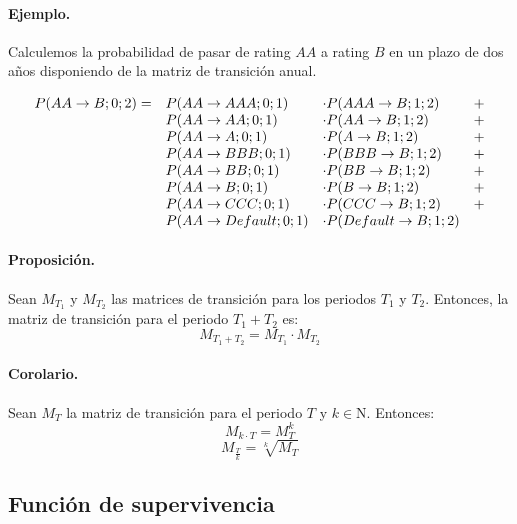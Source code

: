 \paragraph{Ejemplo.} Calculemos la probabilidad de pasar de rating $AA$ a
rating $B$ en un plazo de dos a\~nos disponiendo de la matriz de transici\'on anual.

\begin{displaymath}
\begin{array}{llll}
P(AA \to B;0;2) = & P(AA \to AAA;0;1)     & \cdot P(AAA \to B;1;2)     & + \cr
                  & P(AA \to AA;0;1)      & \cdot P(AA \to B;1;2)      & + \cr
                  & P(AA \to A;0;1)       & \cdot P(A \to B;1;2)       & + \cr
                  & P(AA \to BBB;0;1)     & \cdot P(BBB \to B;1;2)     & + \cr
                  & P(AA \to BB;0;1)      & \cdot P(BB \to B;1;2)      & + \cr
                  & P(AA \to B;0;1)       & \cdot P(B \to B;1;2)       & + \cr
                  & P(AA \to CCC;0;1)     & \cdot P(CCC \to B;1;2)     & + \cr
                  & P(AA \to Default;0;1) & \cdot P(Default \to B;1;2) &
\end{array}
\end{displaymath}

\paragraph{Proposici\'on.} Sean $M_{T_1}$ y $M_{T_2}$ las matrices de transici\'on
para los periodos $T_1$ y $T_2$. Entonces, la matriz de transici\'on para el
periodo $T_1+T_2$ es:
\begin{displaymath}
M_{T_1+T_2} = M_{T_1} \cdot M_{T_2}
\end{displaymath}

\paragraph{Corolario.} Sean $M_{T}$ la matriz de transici\'on para el periodo 
$T$ y $k \in \mathrm{N}$. Entonces:
\begin{displaymath}
M_{k \cdot T} = M_{T}^k
\end{displaymath}
\begin{displaymath}
M_{\frac{T}{k}} = \sqrt[k]{M_{T}}
\end{displaymath}


\subsection{Funci\'on de supervivencia}

